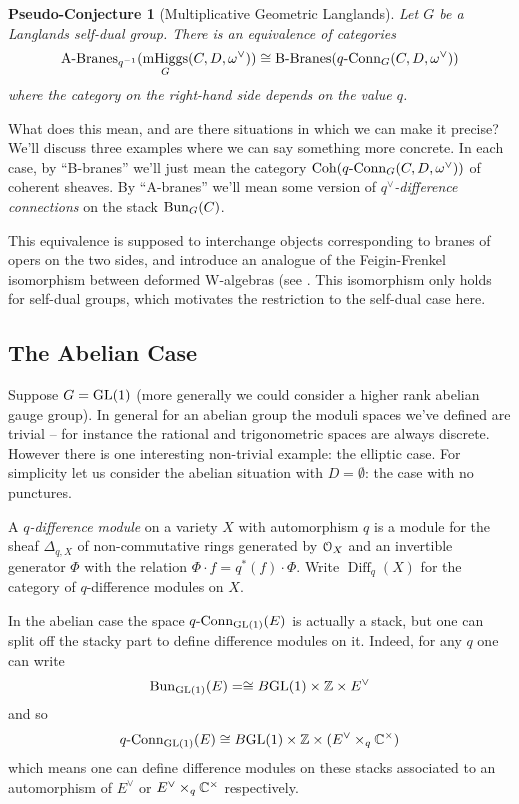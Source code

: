 \documentclass[10pt, oneside]{article}
\DeclareMathOperator{\mhiggs}{mHiggs}
\newcommand{\qconn}{q\text{-Conn}}
\DeclareMathOperator{\diff}{Diff}
\newtheorem{pseudoconj}[definition]{Pseudo-Conjecture}
\begin{document}
\begin{pseudoconj}[Multiplicative Geometric Langlands] \label{multLanglands}
Let $G$ be a Langlands self-dual group.  There is an equivalence of categories
\[\text{A-Branes}_{q^{-1}}(\mhiggs_G(C,D,\omega^\vee)) \iso \text{B-Branes}(\qconn_G(C, D, \omega^\vee))\]
where the category on the right-hand side depends on the value $q$.
\end{pseudoconj}

What does this mean, and are there situations in which we can make it precise?  We'll discuss three examples where we can say something more concrete.  In each case, by ``B-branes'' we'll just mean the category $\coh(\qconn_G(C, D, \omega^\vee))$ of coherent sheaves.  By ``A-branes'' we'll mean some version of \emph{$q^\vee$-difference connections} on the stack $\operatorname{Bun}_G(C)$.

\begin{remark}
This equivalence is supposed to interchange objects corresponding to branes of opers on the two sides, and introduce an analogue of the Feigin-Frenkel isomorphism between deformed W-algebras (see \cite{FrenkelReshetikhinSTS, STSSevostyanov}.  This isomorphism only holds for self-dual groups, which motivates the restriction to the self-dual case here.
\end{remark}

\subsection{The Abelian Case}
Suppose $G = \mathrm{GL}(1)$ (more generally we could consider a higher rank abelian gauge group).  In general for an abelian group the moduli spaces we've defined are trivial -- for instance the rational and trigonometric spaces are always discrete.  However there is one interesting non-trivial example: the elliptic case.  For simplicity let us consider the abelian situation with $D = \emptyset$: the case with no punctures.

\begin{definition}
A \emph{$q$-difference module} on a variety $X$ with automorphism $q$ is a module for the sheaf $\Delta_{q,X}$ of non-commutative rings generated by $\mathcal{O}_X$ and an invertible generator $\Phi$ with the relation $\Phi \cdot f = q^*(f) \cdot \Phi$.  Write $\diff_q(X)$ for the category of $q$-difference modules on $X$.
\end{definition}

In the abelian case the space $\qconn_{\GL(1)}(E)$ is actually a stack, but one can split off the stacky part to define difference modules on it.  Indeed, for any $q$ one can write
\[\operatorname{Bun}_{\mathrm{GL}(1)}(E) = \cong B\mathrm{GL}(1) \times \mathbb{Z} \times E^\vee\]
and so
\[\qconn_{\GL(1)}(E) \iso B\GL(1) \times \ZZ \times (E^\vee \times_q \CC^\times)\]
which means one can define difference modules on these stacks associated to an automorphism of $E^\vee$ or $E^\vee \times_q \mathbb{C}^\times$ respectively.
\end{document}
